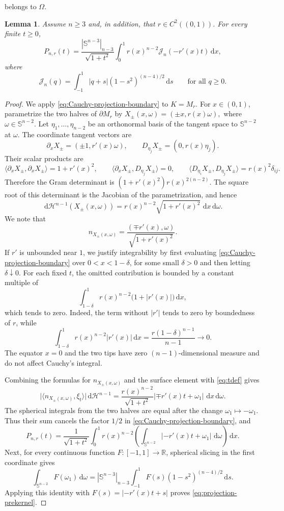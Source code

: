 \documentclass[11pt]{article}
\newtheorem{lemma}[theorem]{Lemma}
\theoremstyle{remark}
\newcommand{\R}{\mathbb{R}}
\newcommand{\Sph}{\mathbb{S}}
\newcommand{\dd}{\,\mathrm{d}}
\newcommand{\abs}[1]{\lvert #1\rvert}
\begin{document}
belongs to $\Omega$.
\begin{lemma}
\label{lem:projection-formula}
Assume $n\geq3$ and, in addition, that
$r\in C^2((0,1))$.  For every finite $t\geq0$,
\begin{equation}\label{eq:projection-prekernel}
 P_{n,r}(t)=\frac{|\Sph^{n-3}|_{n-3}}{\sqrt{1+t^2}}
 \int_0^1r(x)^{n-2}\mathcal J_n(-r'(x)t)\dd x,
\end{equation}
where
\begin{equation}\label{eq:Jndef}
 \mathcal J_n(q)=\int_{-1}^1\abs{q+s}
 (1-s^2)^{(n-4)/2}\dd s
 \qquad\text{for all }q\geq0.
\end{equation}
\end{lemma}

\begin{proof}
We apply \eqref{eq:Cauchy-projection-boundary} to $K=M_r$.
For $x\in(0,1)$, parametrize the two halves of $\partial M_r$ by
$
 X_\pm(x,\omega)=(\pm x,r(x)\omega),$ where $ \omega\in\Sph^{n-2}.
$
Let $\eta_1,\ldots,\eta_{n-2}$ be an orthonormal basis of the tangent
space to $\Sph^{n-2}$ at $\omega$.  The coordinate tangent vectors are
\[
 \partial_xX_\pm=(\pm1,r'(x)\omega),\qquad
 D_{\eta_j}X_\pm=(0,r(x)\eta_j).
\]
Their scalar products are
\[
 \langle\partial_xX_\pm,\partial_xX_\pm\rangle=1+r'(x)^2,
 \qquad
 \langle\partial_xX_\pm,D_{\eta_j}X_\pm\rangle=0,
 \qquad
 \langle D_{\eta_i}X_\pm,D_{\eta_j}X_\pm\rangle
 =r(x)^2\delta_{ij}.
\]
Therefore the Gram determinant is
$(1+r'(x)^2)r(x)^{2(n-2)}$.  The square root of this determinant is the
Jacobian of the parametrization, and hence
\[
 \dd\mathcal H^{n-1}(X_\pm(x,\omega))
 =r(x)^{n-2}\sqrt{1+r'(x)^2}\,\dd x\dd\omega.
\]
 We note that
\[
 n_{X_\pm(x,\omega)}
 =\frac{(\mp r'(x),\omega)}{\sqrt{1+r'(x)^2}}.
\]
If $r'$ is unbounded near $1$, we justify integrability by first
evaluating \eqref{eq:Cauchy-projection-boundary} over
$0<x<1-\delta$, for some small $\delta>0$ and then letting $\delta\downarrow0$.  For each fixed
$t$, the omitted contribution is bounded by a constant multiple of
\[
 \int_{1-\delta}^1r(x)^{n-2}\bigl(1+|r'(x)|\bigr)\dd x,
\]
which tends to zero.  Indeed, the term without $|r'|$ tends to zero by
boundedness of $r$, while
\[
 \int_{1-\delta}^1r(x)^{n-2}|r'(x)|\dd x
 =\frac{r(1-\delta)^{n-1}}{n-1}\longrightarrow0.
\]
The equator $x=0$ and the two tips have zero $(n-1)$-dimensional measure and
do not affect Cauchy's integral.


Combining the formulas for $n_{X_\pm(x,\omega)}$ and the surface
element with \eqref{eq:tdef} gives
\[
 \abs{\langle n_{X_\pm(x,\omega)},\xi_t\rangle}
 \dd\mathcal H^{n-1}
 =\frac{r(x)^{n-2}}{\sqrt{1+t^2}}
   \abs{\mp r'(x)t+\omega_1}\,\dd x\dd\omega.
\]
The spherical integrals from the two halves are equal after the change
$\omega_1\mapsto-\omega_1$.  Thus their sum cancels the factor $1/2$ in
\eqref{eq:Cauchy-projection-boundary}, and
\[
 P_{n,r}(t)=\frac1{\sqrt{1+t^2}}\int_0^1r(x)^{n-2}
 \left(\int_{\Sph^{n-2}}\abs{-r'(x)t+\omega_1}\,\dd\omega\right)\dd x.
\]
Next, for every continuous function $F:[-1,1]\to\R$, spherical
slicing in the first coordinate gives
\[
 \int_{\Sph^{n-2}}F(\omega_1)\dd\omega
 =|\Sph^{n-3}|_{n-3}\int_{-1}^1
 F(s)(1-s^2)^{(n-4)/2}\dd s.
\]
Applying this identity with $F(s)=\abs{-r'(x)t+s}$ proves
\eqref{eq:projection-prekernel}.
\end{proof}
\end{document}
